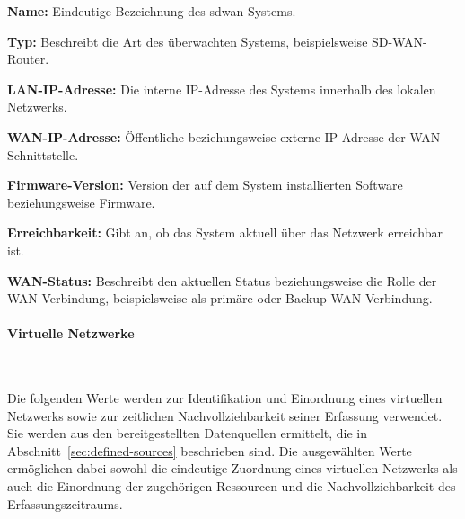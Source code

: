 \begin{compactitem}
    \item \textbf{Name:} Eindeutige Bezeichnung des \gls{sdwan}-Systems.

    \item \textbf{Typ:} Beschreibt die Art des überwachten Systems,
    beispielsweise SD-WAN-Router.

    \item \textbf{LAN-IP-Adresse:} Die interne IP-Adresse des Systems
    innerhalb des lokalen Netzwerks.

    \item \textbf{WAN-IP-Adresse:} Öffentliche beziehungsweise
    externe IP-Adresse der WAN-Schnittstelle.

    \item \textbf{Firmware-Version:} Version der auf dem System
    installierten Software beziehungsweise Firmware.

    \item \textbf{Erreichbarkeit:} Gibt an, ob das System aktuell über
    das Netzwerk erreichbar ist.

    \item \textbf{WAN-Status:} Beschreibt den aktuellen Status beziehungsweise
    die Rolle der WAN-Verbindung, beispielsweise als primäre oder
    Backup-WAN-Verbindung.
\end{compactitem}

\paragraph{Virtuelle Netzwerke}
\label{par:virtuel-networks}

~

Die folgenden Werte werden zur Identifikation und Einordnung eines virtuellen
Netzwerks sowie zur zeitlichen Nachvollziehbarkeit seiner Erfassung verwendet.
Sie werden aus den bereitgestellten Datenquellen ermittelt, die in
Abschnitt~\ref{sec:defined-sources} beschrieben sind. Die ausgewählten Werte
ermöglichen dabei sowohl die eindeutige Zuordnung eines virtuellen Netzwerks
als auch die Einordnung der zugehörigen Ressourcen und die Nachvollziehbarkeit
des Erfassungszeitraums.

